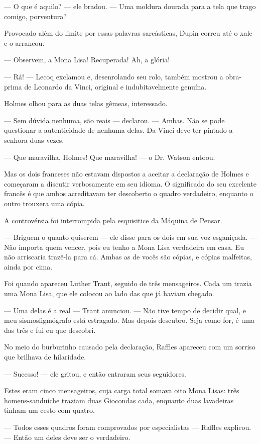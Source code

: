--- O que é aquilo? --- ele bradou. --- Uma moldura dourada para a tela
que trago comigo, porventura?

Provocado além do limite por essas palavras sarcásticas, Dupin correu
até o xale e o arrancou.

--- Observem, a Mona Lisa! Recuperada! Ah, a glória!

--- Rá! --- Lecoq exclamou e, desenrolando seu rolo, também mostrou a
obra-prima de Leonardo da Vinci, original e indubitavelmente genuína.

Holmes olhou para as duas telas gêmeas, interessado.

--- Sem dúvida nenhuma, são reais --- declarou. --- Ambas. Não se pode
questionar a autenticidade de nenhuma delas. Da Vinci deve ter pintado a
senhora duas vezes.

--- Que maravilha, Holmes! Que maravilha! --- o Dr. Watson entoou.

Mas os dois franceses não estavam dispostos a aceitar a declaração de
Holmes e começaram a discutir verbosamente em seu idioma. O significado
do seu excelente francês é que ambos acreditavam ter descoberto o quadro
verdadeiro, enquanto o outro trouxera uma cópia.

A controvérsia foi interrompida pela esquisitice da Máquina de Pensar.

--- Briguem o quanto quiserem --- ele disse para os dois em sua voz
esganiçada. --- Não importa quem vencer, pois eu tenho a Mona Lisa
verdadeira em casa. Eu não arriscaria trazê-la para cá. Ambas as de
vocês são cópias, e cópias malfeitas, ainda por cima.

Foi quando apareceu Luther Trant, seguido de três mensageiros. Cada um
trazia uma Mona Lisa, que ele colocou ao lado das que já haviam chegado.

--- Uma delas é a real --- Trant anunciou. --- Não tive tempo de decidir
qual, e meu sismosfigmógrafo está estragado. Mas depois descubro. Seja
como for, é uma das três e fui eu que descobri.

No meio do burburinho causado pela declaração, Raffles apareceu com um
sorriso que brilhava de hilaridade.

--- Sucesso! --- ele gritou, e então entraram seus seguidores.

Estes eram cinco mensageiros, cuja carga total somava oito Mona Lisas:
três homens-sanduíche traziam duas Giocondas cada, enquanto duas
lavadeiras tinham um cesto com quatro.

--- Todos esses quadros foram comprovados por especialistas --- Raffles
explicou. --- Então um deles deve ser o verdadeiro.

